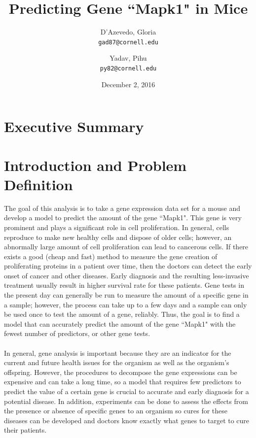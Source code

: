 \documentclass{article}
\title{Predicting Gene ``Mapk1" in Mice}
\author{
  D'Azevedo, Gloria\\
  \texttt{gad87@cornell.edu}
  \and
  Yadav, Pihu\\
  \texttt{py82@cornell.edu}
}
\date{December 2, 2016}
\begin{document}
\maketitle

\section{Executive Summary}

\section{Introduction and Problem Definition}
The goal of this analysis is to take a gene expression data set for a mouse and develop a model to predict the amount of the gene ``Mapk1".  This gene is very prominent and plays a significant role in cell proliferation.  In general, cells reproduce to make new healthy cells and dispose of older cells; however, an abnormally large amount of cell proliferation can lead to cancerous cells.  If there exists a good (cheap and fast) method to measure the gene creation of proliferating proteins in a patient over time, then the doctors can detect the early onset of cancer and other diseases.  Early diagnosis and the resulting less-invasive treatment usually result in higher survival rate for these patients.  Gene tests in the present day can generally be run to measure the amount of a specific gene in a sample; however, the process can take up to a few days and a sample can only be used once to test the amount of a gene, reliably.  Thus, the goal is to find a model that can accurately predict the amount of the gene  ``Mapk1" with the fewest number of predictors, or other gene tests.\\
\null\\
%
In general, gene analysis is important because they are an indicator for the current and future health issues for the organism as well as the organism's offspring.  However, the procedures to decompose the gene expressions can be expensive and can take a long time, so a model that requires few predictors to predict the value of a certain gene is crucial to accurate and early diagnosis for a potential disease.  In addition, experiments can be done to assess the effects from the presence or absence of specific genes to an organism so cures for these diseases can be developed and doctors know exactly what genes to target to cure their patients.\\
\null\\
\end{document}
